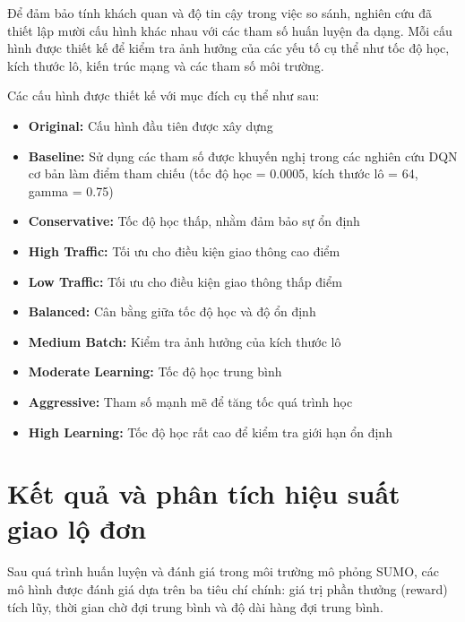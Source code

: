 Để đảm bảo tính khách quan và độ tin cậy trong việc so sánh, nghiên cứu đã thiết
lập mười cấu hình khác nhau với các tham số huấn luyện đa dạng. Mỗi cấu hình
được thiết kế để kiểm tra ảnh hưởng của các yếu tố cụ thể như tốc độ học, kích thước
lô, kiến trúc mạng và các tham số môi trường.

Các cấu hình được thiết kế với mục đích cụ thể như sau:
\begin{itemize}
    \item \textbf{Original:} Cấu hình đầu tiên được xây dựng
    
    \item \textbf{Baseline:} Sử dụng các tham số được khuyến nghị trong các nghiên cứu DQN cơ bản làm điểm tham chiếu (tốc độ học = 0.0005, kích thước lô = 64, gamma = 0.75) 

    \item \textbf{Conservative:} Tốc độ học thấp, nhằm đảm bảo sự ổn định

    \item \textbf{High Traffic:} Tối ưu cho điều kiện giao thông cao điểm

    \item \textbf{Low Traffic:} Tối ưu cho điều kiện giao thông thấp điểm

    \item \textbf{Balanced:} Cân bằng giữa tốc độ học và độ ổn định

    \item \textbf{Medium Batch:} Kiểm tra ảnh hưởng của kích thước lô

    \item \textbf{Moderate Learning:} Tốc độ học trung bình


    \item \textbf{Aggressive:} Tham số mạnh mẽ để tăng tốc quá trình học

    \item \textbf{High Learning:} Tốc độ học rất cao để kiểm tra giới hạn ổn định
\end{itemize}

\section{Kết quả và phân tích hiệu suất giao lộ đơn}

Sau quá trình huấn luyện và đánh giá trong môi trường mô phỏng SUMO, các mô hình được đánh giá dựa trên ba tiêu chí chính: giá trị phần thưởng (reward) tích lũy, thời gian chờ đợi trung bình và độ dài hàng đợi trung bình.

